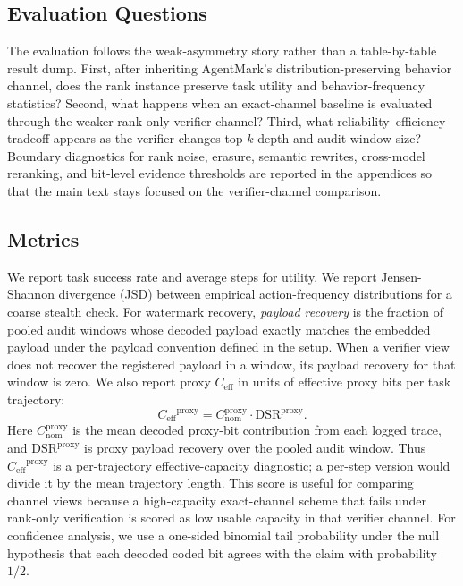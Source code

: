 \documentclass[conference,compsoc]{IEEEtran}
\newcommand{\Ceff}{\ensuremath{C_{\mathrm{eff}}}}
\begin{document}
\subsection{Evaluation Questions}

The evaluation follows the weak-asymmetry story rather than a table-by-table result dump. First, after inheriting AgentMark's distribution-preserving behavior channel, does the rank instance preserve task utility and behavior-frequency statistics? Second, what happens when an exact-channel baseline is evaluated through the weaker rank-only verifier channel? Third, what reliability--efficiency tradeoff appears as the verifier changes top-$k$ depth and audit-window size? Boundary diagnostics for rank noise, erasure, semantic rewrites, cross-model reranking, and bit-level evidence thresholds are reported in the appendices so that the main text stays focused on the verifier-channel comparison.

\subsection{Metrics}

We report task success rate and average steps for utility. We report Jensen-Shannon divergence (JSD) between empirical action-frequency distributions for a coarse stealth check. For watermark recovery, \emph{payload recovery} is the fraction of pooled audit windows whose decoded payload exactly matches the embedded payload under the payload convention defined in the setup. When a verifier view does not recover the registered payload in a window, its payload recovery for that window is zero. We also report proxy $\Ceff$ in units of effective proxy bits per task trajectory:
\begin{equation}
  \Ceff^{\mathrm{proxy}}
  =
  C_{\mathrm{nom}}^{\mathrm{proxy}}
  \cdot
  \mathrm{DSR}^{\mathrm{proxy}} .
\end{equation}
Here $C_{\mathrm{nom}}^{\mathrm{proxy}}$ is the mean decoded proxy-bit contribution from each logged trace, and $\mathrm{DSR}^{\mathrm{proxy}}$ is proxy payload recovery over the pooled audit window. Thus $\Ceff^{\mathrm{proxy}}$ is a per-trajectory effective-capacity diagnostic; a per-step version would divide it by the mean trajectory length. This score is useful for comparing channel views because a high-capacity exact-channel scheme that fails under rank-only verification is scored as low usable capacity in that verifier channel. For confidence analysis, we use a one-sided binomial tail probability under the null hypothesis that each decoded coded bit agrees with the claim with probability $1/2$.
\end{document}
